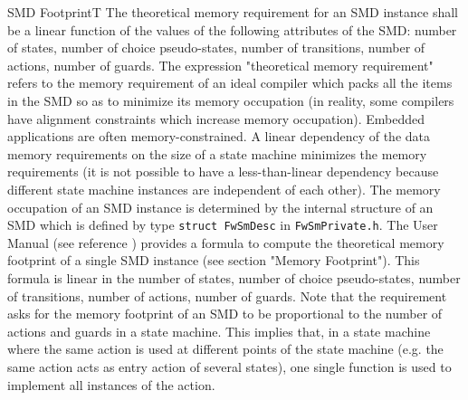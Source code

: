 \documentclass[requirements]{../fwprofile}
\begin{document}
\begin{fw_req_note}{SMD Footprint}{T}
{The theoretical memory requirement for an SMD instance shall 
be a linear function of the values of the following attributes 
of the SMD: number of states, number of choice pseudo-states, number of transitions, 
number of actions, number of guards.}
{The expression "theoretical memory requirement" refers to the memory requirement 
of an ideal compiler which packs all the items in the SMD so as to minimize its memory 
occupation (in reality, some compilers have alignment constraints which increase memory occupation).}
{Embedded applications are often memory-constrained. A linear 
dependency of the data memory requirements on the size of a state machine minimizes 
the memory requirements (it is not possible to have a less-than-linear dependency 
because different state machine instances are independent of each other).}
{The memory occupation of an SMD instance is determined by the 
internal structure of an SMD which is defined by type 
\texttt{struct FwSmDesc} in \texttt{FwSmPrivate.h}.} 
{The User Manual (see reference \cite{ref:um}) provides a formula to compute the theoretical 
memory footprint of a single SMD instance (see section "Memory Footprint"). 
This formula is linear in the number of states, number of choice 
pseudo-states, number of transitions, number of actions, 
number of guards. Note that the requirement asks for the memory footprint of an SMD to 
be proportional to the number of actions and guards in a state machine. 
This implies that, in a state machine where the same action is used at different points 
of the state machine (e.g. the same action acts as entry action of several states), one 
single function is used to implement all instances of the action.}
\end{fw_req_note}
\end{document}
